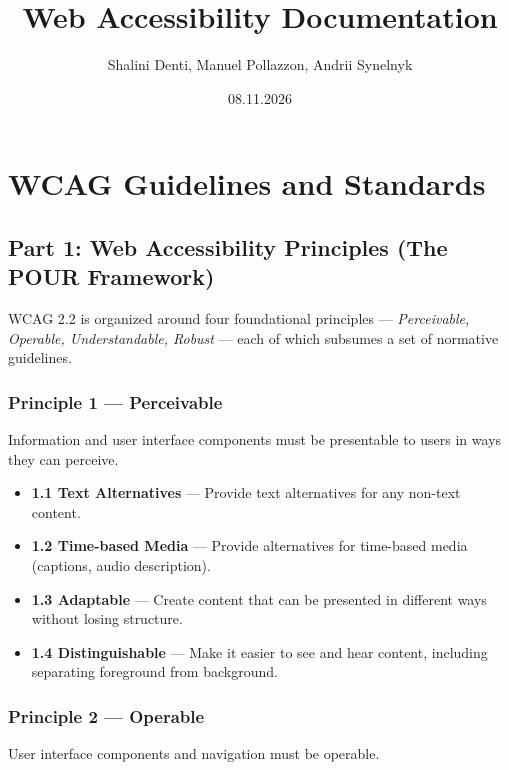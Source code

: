 \documentclass[11pt,a4paper]{article}
\title{Web Accessibility Documentation}
\author{Shalini Denti, Manuel Pollazzon, Andrii Synelnyk}
\date{08.11.2026}
\begin{document}
\maketitle

\pagecolor{white}
\tableofcontents

\newpage


\section{WCAG Guidelines and Standards}

	\subsection{Part 1: Web Accessibility Principles (The POUR Framework)}

	WCAG 2.2 is organized around four foundational principles ---
	\emph{Perceivable, Operable, Understandable, Robust} --- each of which
	subsumes a set of normative guidelines.

		\subsubsection{Principle 1 --- Perceivable} 
		
		Information and user interface components must be presentable to users in ways
		they can perceive.

		\begin{itemize}
		  \item \textbf{1.1 Text Alternatives} --- Provide text alternatives for any
       		 non-text content.
 		 \item \textbf{1.2 Time-based Media} --- Provide alternatives for time-based
        		media (captions, audio description).
		  \item \textbf{1.3 Adaptable} --- Create content that can be presented in
       		 different ways without losing structure.
  		\item \textbf{1.4 Distinguishable} --- Make it easier to see and hear
      		  content, including separating foreground from background.
		\end{itemize}


		\subsubsection{Principle 2 --- Operable}
		User interface components and navigation must be operable.
		
\end{document}
